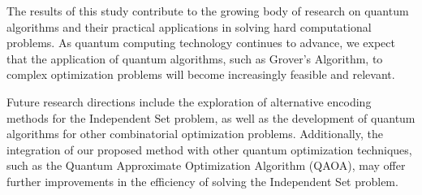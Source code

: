The results of this study contribute to the growing body of research on quantum algorithms and their practical applications in solving hard computational problems. As quantum computing technology continues to advance, we expect that the application of quantum algorithms, such as Grover's Algorithm, to complex optimization problems will become increasingly feasible and relevant.

Future research directions include the exploration of alternative encoding methods for the Independent Set problem, as well as the development of quantum algorithms for other combinatorial optimization problems. Additionally, the integration of our proposed method with other quantum optimization techniques, such as the Quantum Approximate Optimization Algorithm (QAOA), may offer further improvements in the efficiency of solving the Independent Set problem.

